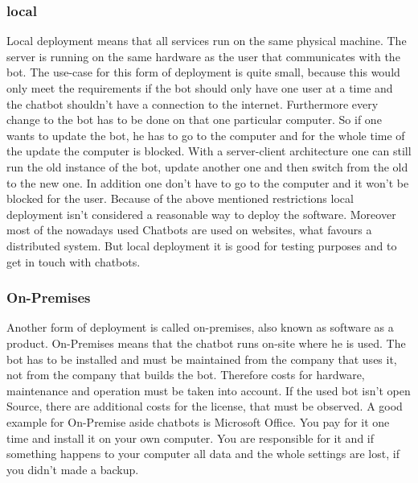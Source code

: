 \documentclass[10pt,final,journal,a4paper,oneside,twocolumn]{IEEEtran}
\begin{document}
\subsubsection{local}
Local deployment means that all services run on the same physical machine. The server is running on the same hardware as the user that communicates with the bot. The use-case for this form of deployment is quite small, because this would only meet the requirements if the bot should only have one user at a time and the chatbot shouldn't have a connection to the internet. Furthermore every change to the bot has to be done on that one particular computer. So if one wants to update the bot, he has to go to the computer and for the whole time of the update the computer is blocked. With a server-client architecture one can still run the old instance of the bot, update another one and then switch from the old to the new one. In addition one don't have to go to the computer and it won't be blocked for the user. Because of the above mentioned restrictions local deployment isn't considered a reasonable way to deploy the software. Moreover most of the nowadays used Chatbots are used on websites, what favours a distributed system. But local deployment it is good for testing purposes and to get in touch with chatbots.

\subsubsection{On-Premises}
Another form of deployment is called on-premises, also known as software as a product. On-Premises means that the chatbot runs on-site where he is used. The bot has to be installed and must be maintained from the company that uses it, not from the company that builds the bot. Therefore costs for hardware, maintenance and operation must be taken into account.\cite{b26} If the used bot isn't open Source, there are additional costs for the license, that must be observed. A good example for On-Premise aside chatbots is Microsoft Office. You pay for it one time and install it on your own computer. You are responsible for it and if something happens to your computer all data and the whole settings are lost, if you didn't made a backup.
\end{document}

